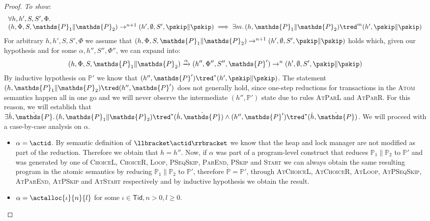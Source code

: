 {\begin{proof}
\textit{To show}:
\[
\begin{array}{l}
\forall h, h', S, S', \Phi \ldotp \\
(h, \Phi, S, \mathds{P}_1 \| \mathds{P}_2) \rightarrow^{n+1} (h', \emptyset, S', \pskip \| \pskip) \implies \exists m \ldotp (h, \mathds{P}_1 \| \mathds{P}_2) \tred^m (h', \pskip \| \pskip)
\end{array}
\]
For arbitrary $h, h', S, S', \Phi$ we assume that $(h, \Phi, S, \mathds{P}_1 \| \mathds{P}_2) \rightarrow^{n+1} (h', \emptyset, S', \pskip \| \pskip)$ holds which, given our hypothesis and for some $\alpha, h'', S'', \Phi''$, we can expand into:
\[
(h, \Phi, S, \mathds{P}_1 \| \mathds{P}_2) \xrightarrow{\alpha} (h'', \Phi'', S'', \mathds{P}') \rightarrow^{n} (h', \emptyset, S', \pskip \| \pskip)
\]
By inductive hypothesis on $\mathds{P}'$ we know that $(h'', \mathds{P}') \tred^* (h', \pskip \| \pskip)$. The statement $(h, \mathds{P}_1 \| \mathds{P}_2) \tred (h'', \mathds{P}')$ does not generally hold, since one-step reductions for transactions in the \textsc{Atom} semantics happen all in one go and we will never observe the intermediate $(h'', \mathds{P}')$ state due to rules \textsc{AtParL} and \textsc{AtParR}. For this reason, we will establish that $\exists \dot{h}, \dot{\mathds{P}} \ldotp (h, \mathds{P}_1 \| \mathds{P}_2) \tred^* (\dot{h}, \dot{\mathds{P}}) \land (h'', \mathds{P}') \tred^* (\dot{h}, \dot{\mathds{P}})$.
We will proceed with a case-by-case analysis on $\alpha$.
\begin{itemize}
\item $\alpha = \actid$. By semantic definition of $\llbracket \actid \rrbracket$ we know that the heap and lock manager are not modified as part of the reduction. Therefore we obtain that $h = h''$. Now, if $\alpha$ was part of a program-level construct that reduces $\mathds{P}_1 \| \mathds{P}_2$ to $\mathds{P}'$ and was generated by one of \textsc{ChoiceL}, \textsc{ChoiceR}, \textsc{Loop}, \textsc{PSeqSkip}, \textsc{ParEnd}, \textsc{PSkip} and \textsc{Start} we can always obtain the same resulting program in the atomic semantics by reducing $\mathds{P}_1 \| \mathds{P}_2$ to $\mathds{P}'$, therefore $\dot{\mathds{P}} = \mathds{P}'$, through \textsc{AtChoiceL}, \textsc{AtChoiceR}, \textsc{AtLoop}, \textsc{AtPSeqSkip}, \textsc{AtParEnd},  \textsc{AtPSkip} and \textsc{AtStart} respectively and by inductive hypothesis we obtain the result.
\item $\alpha = \actalloc{\iota}{n}{l}$ for some $\iota \in \mathsf{Tid}, n > 0, l \geq 0$.
\end{itemize}

\end{proof}}
